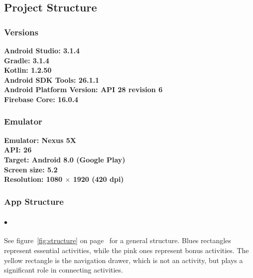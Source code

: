 \documentclass[12pt]{article}
\begin{document}
\subsection{Project Structure}
\subsubsection{Versions}
\hspace{12pt}\textbf{Android Studio: 3.1.4} \\
\null\hspace{12pt}\textbf{Gradle: 3.1.4} \\
\null\hspace{12pt}\textbf{Kotlin: 1.2.50} \\
\null\hspace{12pt}\textbf{Android SDK Tools: 26.1.1} \\
\null\hspace{12pt}\textbf{Android Platform Version: API 28 revision 6} \\
\null\hspace{12pt}\textbf{Firebase Core: 16.0.4}
\subsubsection{Emulator}
\hspace{12pt}\textbf{Emulator: Nexus 5X} \\
\null\hspace{12pt}\textbf{API: 26} \\
\null\hspace{12pt}\textbf{Target: Android 8.0 (Google Play)} \\
\null\hspace{12pt}\textbf{Screen size: 5.2} \\
\null\hspace{12pt}\textbf{Resolution: 1080 $\times$ 1920 (420 dpi)}
\subsubsection{App Structure}
\paragraph{$\bullet$}
See figure~\ref{fig:structure} on page~\pageref{fig:structure} for a general structure.
Blues rectangles represent essential activities, while the pink ones represent bonus activities. The yellow rectangle is the navigation drawer, which is not an activity, but plays a significant role in connecting activities.
\end{document}
